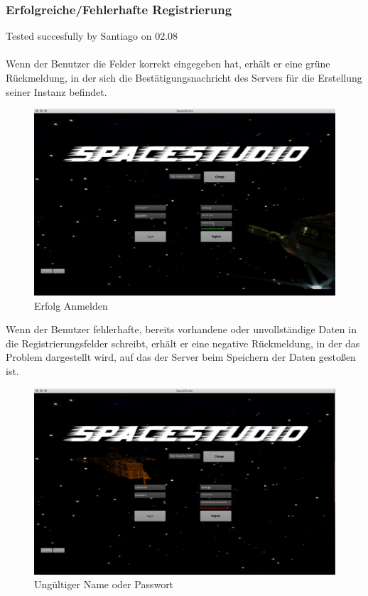 \documentclass[12pt]{article}
\begin{document}
\subsubsection{Erfolgreiche/Fehlerhafte  Registrierung}
Tested succesfully by Santiago on 02.08\\\\
Wenn der Benutzer die Felder korrekt eingegeben hat, erhält er eine grüne Rückmeldung, in der sich die Bestätigungsnachricht des Servers für die Erstellung seiner Instanz befindet.\\
\begin{figure}[h]
\centering
\includegraphics[scale=0.4]{TestProtocolBilder/erfolgAnmelden.jpg}
\caption{Erfolg Anmelden}
\end{figure}

Wenn der Benutzer fehlerhafte, bereits vorhandene oder unvollständige Daten in die Registrierungsfelder schreibt, erhält er eine negative Rückmeldung, in der das Problem dargestellt wird, auf das der Server beim Speichern der Daten gestoßen ist.\\
\begin{figure}[h]
\centering
\includegraphics[scale=0.4]{TestProtocolBilder/doesnotMatchPassword.jpg}
\caption{Ungültiger Name oder Passwort}
\end{figure}
\newpage
\end{document}
